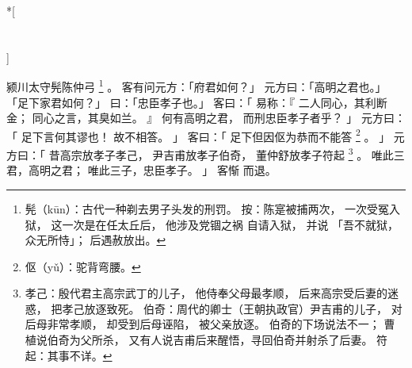 
\switchcolumn[0]*[\section{}]

颍川太守髡陈仲弓%
\footnote{%
    髡（kūn）：古代一种剃去男子头发的刑罚。
    按：陈寔被捕两次，
        一次受冤入狱，
        这一次是在任太丘后，
        他涉及党锢之祸
        自请入狱，
        并说
        「吾不就狱，众无所恃」；
        后遇赦放出。
}%
。
客有问元方：「府君如何？」
元方曰：「高明之君也。」
「足下家君如何？」
曰：「忠臣孝子也。」
客曰：「
    易称：『
        二人同心，其利断金；
        同心之言，其臭如兰。
    』
    何有高明之君，
    而刑忠臣孝子者乎？
」
元方曰：「
    足下言何其谬也！
    故不相答。
」
客曰：「
    足下但因伛为恭而不能答%
    \footnote{%
        伛（yǔ）：驼背弯腰。
    }%
    。
」
元方曰：「
    昔高宗放孝子孝己，
    尹吉甫放孝子伯奇，
    董仲舒放孝子符起%
    \footnote{%
        孝己：殷代君主高宗武丁的儿子，
              他侍奉父母最孝顺，
              后来高宗受后妻的迷惑，
              把孝己放逐致死。
        伯奇：周代的卿士（王朝执政官）尹吉甫的儿子，
              对后母非常孝顺，
              却受到后母诬陷，
              被父亲放逐。
              伯奇的下场说法不一；
              曹植说伯奇为父所杀，
              又有人说吉甫后来醒悟，寻回伯奇并射杀了后妻。
        符起：其事不详。
    }%
    。
    唯此三君，高明之君；
    唯此三子，忠臣孝子。
」
客惭
而退。

\switchcolumn



